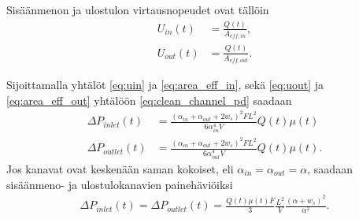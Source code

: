 Sisäänmenon ja ulostulon virtausnopeudet ovat tällöin
\begin{align}
    U_{in}(t) &= \frac{Q(t)}{A_{eff, in}}, \label{eq:uin}\\
    U_{out}(t) &= \frac{Q(t)}{A_{eff, out}}. \label{eq:uout}
\end{align}

Sijoittamalla yhtälöt \eqref{eq:uin} ja \eqref{eq:area_eff_in}, sekä \eqref{eq:uout} ja \eqref{eq:area_eff_out} yhtälöön \eqref{eq:clean_channel_pd} saadaan
\begin{align}
    \Delta P_{inlet}(t) &=  \frac{(\alpha_{in}+\alpha_{out}+2w_s)^2F L^2}{6\alpha_{in}^4V}Q(t) \mu(t) \label{eq:DeltaP_inlet_clean}
    \\ 
    \Delta P_{outlet}(t) &=\frac{(\alpha_{in}+\alpha_{out}+2w_s)^2FL^2}{6\alpha_{out}^4V}Q(t) \mu(t).
\end{align}
Jos kanavat ovat keskenään saman kokoiset, eli  \(\alpha_{in}=\alpha_{out}=\alpha\), saadaan sisäänmeno- ja ulostulokanavien painehäviöiksi 
\begin{align}
    \Delta P_{inlet}(t)= \Delta P_{outlet}(t) =  \frac{Q(t)\mu(t) F}{3} \frac{L^2}{V}\frac{(\alpha+w_s)^2}{\alpha^2}.
\end{align}


